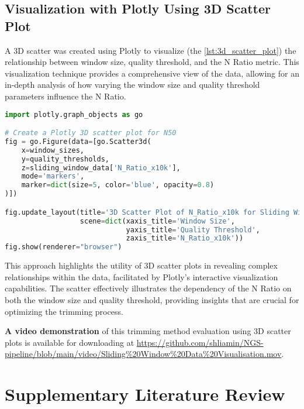 \subsection{Visualization with Plotly Using 3D Scatter Plot } \label{sec:sliding_window_trimming_visualisation}
A 3D \gls{scatter} was created using Plotly to visualize (the \autoref{lst:3d_scatter_plot}) the relationship between window size, quality threshold, and the N Ratio metric. This visualization technique provides a comprehensive view of the data, allowing for an in-depth analysis of how varying the window size and quality threshold parameters influence the N Ratio.

\begin{lstlisting}[language=Python, label={lst:3d_scatter_plot}, caption=Creating 3D Scatter Plot with Plotly]
import plotly.graph_objects as go

# Create a Plotly 3D scatter plot for N50
fig = go.Figure(data=[go.Scatter3d(
    x=window_sizes,
    y=quality_thresholds,
    z=sliding_window_data['N_Ratio_x10k'],
    mode='markers',
    marker=dict(size=5, color='blue', opacity=0.8)
)])

fig.update_layout(title='3D Scatter Plot of N_Ratio_x10k for Sliding Window Trimming',
                  scene=dict(xaxis_title='Window Size',
                             yaxis_title='Quality Threshold',
                             zaxis_title='N_Ratio_x10k'))
fig.show(renderer="browser")
\end{lstlisting}

This approach highlights the utility of 3D scatter plots in revealing complex relationships within the data, facilitated by Plotly's interactive visualization capabilities. The \gls{scatter} effectively illustrates the dependency of the N Ratio on both the window size and quality threshold, providing insights that are crucial for optimizing the \gls{trimming} process.

\textbf{A video demonstration} of this \gls{trimming} method evaluation using 3D scatter plots is available for downloading at \url{https://github.com/shliamin/NGS-pipeline/blob/main/video/Sliding%20Window%20Data%20Visualisation.mov}.







\section{Supplementary Literature Review}

